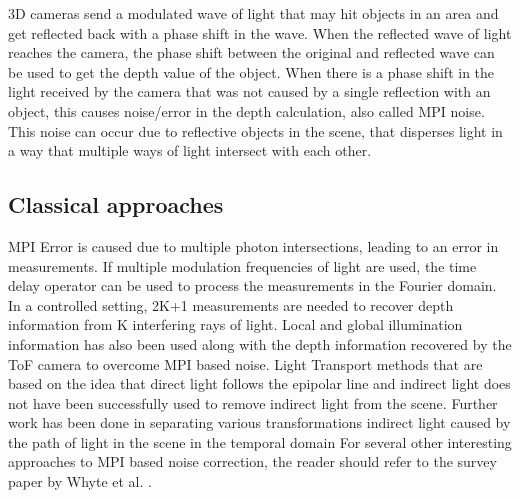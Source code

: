\documentclass[runningheads]{llncs}
\begin{document}
3D cameras send a modulated wave of light that may hit objects in an area and get reflected back with a phase shift in the wave. 
When the reflected wave of light reaches the camera, the phase shift between the original and reflected wave can be used to get the depth value of the object. 
When there is a phase shift in the light received by the camera that was not caused by a single reflection with an object, this causes noise/error in the depth calculation, also called MPI noise.
This noise can occur due to reflective objects in the scene, that disperses light in a way that multiple ways of light intersect with each other. 








\subsection{Classical approaches} MPI Error is caused due to multiple photon intersections, leading to an error in measurements. 
If multiple modulation frequencies of light are used, the time delay operator can be used to process the measurements in the Fourier domain\cite{bhandari2016}. 
In a controlled setting, 2K+1 measurements are needed to recover depth information from K interfering rays of light\cite{bhandari2015}. 
Local and global illumination information has also been used along with the depth information recovered by the ToF camera to overcome MPI based noise\cite{naik2015}.
Light Transport methods that are based on the idea that direct light follows the epipolar line and indirect light does not have been successfully used to remove indirect light from the scene\cite{otoole2014}. 
Further work has been done in separating various transformations indirect light caused by the path of light in the scene in the temporal domain\cite{otoole2014siggraph}
For several other interesting approaches to MPI based noise correction, the reader should refer to the survey paper by Whyte et al. \cite{whyte2014}
.
\end{document}
